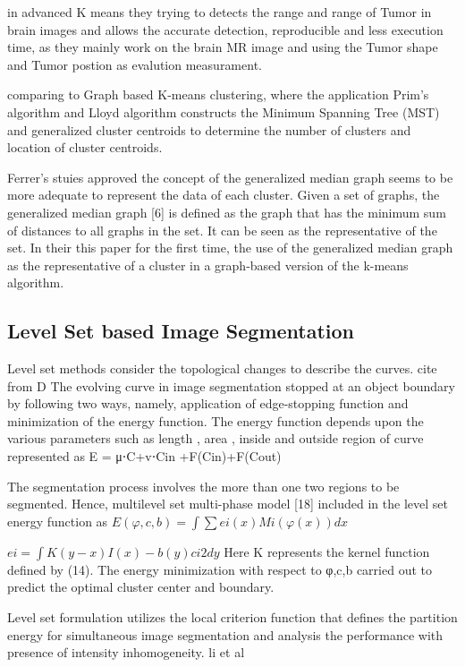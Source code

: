 in  advanced K means they trying to detects the range and range of Tumor in brain images and allows the accurate detection, reproducible and less execution time, as they mainly work on the brain MR image and using the Tumor shape and Tumor postion as evalution measurament. 

comparing to Graph based K-means clustering, where the application Prim’s algorithm and Lloyd algorithm constructs the Minimum Spanning Tree (MST) and generalized cluster centroids to determine the number of clusters and location of cluster centroids. 

Ferrer's stuies approved the concept of the generalized median graph seems to be more adequate to represent the data of each cluster.  Given a set of graphs, the generalized median graph [6] is defined as the graph that has the minimum sum of distances to all graphs in the set. It can be seen as the representative of the set.  In their this paper  for the first time, the use of the generalized median graph as the representative of a cluster in a graph-based version of the k-means algorithm. 



\subsection{ Level Set based Image Segmentation }
Level set methods consider the topological changes to describe the curves. cite from D The evolving curve in image segmentation stopped at an object boundary by following two ways, namely, application of edge-stopping function and minimization of the energy function.
The energy function depends upon the various parameters such as length , area , inside   and outside   region of curve represented as 
E = μ⋅C+v⋅Cin +F(Cin)+F(Cout)

The segmentation process involves the more than one two regions to be segmented. Hence, multilevel set multi-phase
model [18] included in the level set energy function as
$E(φ,c,b)=∫∑ei(x)Mi(φ(x))dx$

$ei =∫K(y−x)I(x)−b(y)ci2dy$
Here K represents the kernel function defined by (14). The energy minimization with respect to  φ,c,b  carried out to predict the optimal cluster center and boundary.


Level set formulation utilizes the local criterion function that defines the partition energy for simultaneous image segmentation and analysis the performance with presence of intensity inhomogeneity. li et al

